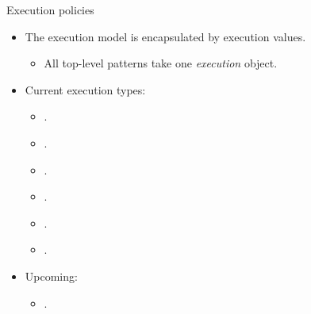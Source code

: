\begin{frame}[t]{Execution policies}
\begin{itemize}
  \item The execution model is encapsulated by execution values.
    \begin{itemize}
      \item All top-level patterns take one \emph{execution} object.
    \end{itemize}
  \vfill
  \item Current execution types:
    \begin{itemize}
      \item {}.
      \item {}.
      \item {}.
      \item {}.
      \item {}.
      \item {}.
    \end{itemize}
  \vfill
  \item Upcoming:
    \begin{itemize}
      \item {}.
    \end{itemize}
  \vfill
\end{itemize}
\end{frame}

